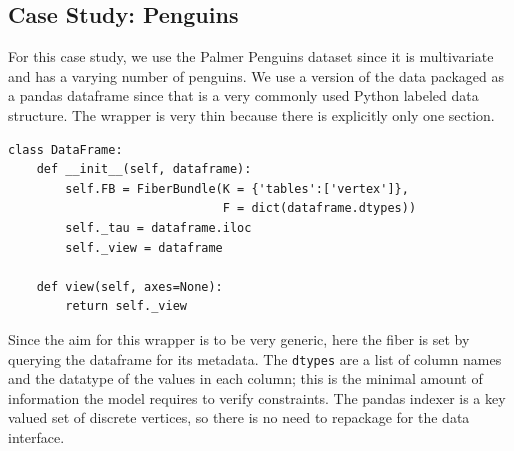 \documentclass[../main.tex]{subfiles}
\begin{document}
\subsection{Case Study: Penguins}
For this case study, we use the Palmer Penguins dataset\cite{gormanEcologicalSexualDimorphism2014, horstPalmerpenguinsPalmerArchipelago2020} since it is multivariate and has a varying number of penguins. We use a version of the data packaged as a pandas dataframe\cite{nakhaeeMcnakhaeePalmerpenguins2021} since that is a very commonly used Python labeled data structure. The wrapper is very thin because there is explicitly only one section.
\begin{verbatim}
class DataFrame:
    def __init__(self, dataframe):
        self.FB = FiberBundle(K = {'tables':['vertex']},
                              F = dict(dataframe.dtypes))
        self._tau = dataframe.iloc
        self._view = dataframe

    def view(self, axes=None):
        return self._view
\end{verbatim}
Since the aim for this wrapper is to be very generic, here the fiber is set by querying the dataframe for its metadata. The \texttt{dtypes} are a list of column names and the datatype of the values in each column; this is the minimal amount of information the model requires to verify constraints. The pandas indexer is a key valued set of discrete vertices, so there is no need to repackage for the data interface. 
\end{document}
